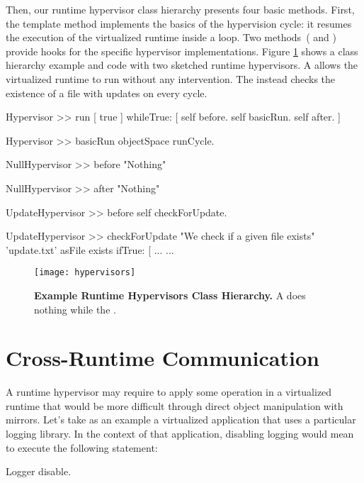 Then, our runtime hypervisor class hierarchy presents four basic methods. First, the  template method implements the basics of the hypervision cycle: it resumes the execution of the virtualized runtime inside a loop. Two methods~( and ) provide hooks for the specific hypervisor implementations. Figure \ref{fig:hypervisors} shows a class hierarchy example and code with two sketched runtime hypervisors. A  allows the virtualized runtime to run without any intervention. The  instead checks the existence of a file with updates on every cycle.

\begin{code}
Hypervisor >> run
    [ true ] whileTrue: [
        self before.
        self basicRun.
        self after.
    ]

Hypervisor >> basicRun
    objectSpace runCycle.

NullHypervisor >> before
    "Nothing"

NullHypervisor >> after
    "Nothing"

UpdateHypervisor >> before
    self checkForUpdate.

UpdateHypervisor >> checkForUpdate
    "We check if a given file exists"
    'update.txt' asFile exists ifTrue: [ ...
    ...
\end{code}

\begin{figure}[ht]
\center
\texttt{[image: hypervisors]}
\caption{\textbf{Example Runtime Hypervisors Class Hierarchy.} A  does nothing while the .\label{fig:hypervisors}}
\end{figure}

\section{Cross-Runtime Communication} \label{sec:communication}\label{sec:isolation}

A runtime hypervisor may require to apply some operation in a virtualized runtime that would be more difficult through direct object manipulation with mirrors. Let's take as an example a virtualized application that uses a particular logging library. In the context of that application, disabling logging would mean to execute the following statement:

\begin{code}
Logger disable.
\end{code}


